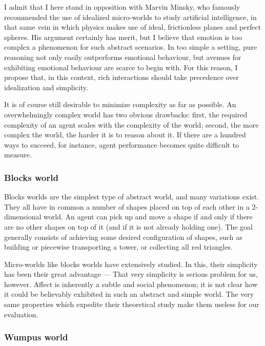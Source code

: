 \documentclass[]{scrartcl}
\theoremstyle{break}
\begin{document}
I admit that I here stand in opposition with Marvin Minsky, who famously recommended the use of idealized micro-worlds to study artificial intelligence, in that same vein in which physics makes use of ideal, frictionless planes and perfect spheres. His argument certainly has merit, but I believe that emotion is too complex a phenomenon for such abstract scenarios. In too simple a setting, pure reasoning not only easily outperforms emotional behaviour, but avenues for exhibiting emotional behaviour are scarce to begin with. For this reason, I propose that, in this context, rich interactions should take precedence over idealization and simplicity.

It is of course still desirable to minimize complexity as far as possible. An overwhelmingly complex world has two obvious drawbacks: first, the required complexity of an agent scales with the complexity of the world; second, the more complex the world, the harder it is to reason about it. If there are a hundred ways to succeed, for instance, agent performance becomes quite difficult to measure.

\subsubsection{Blocks world}

Blocks worlds are the simplest type of abstract world, and many variations exist. They all have in common a number of shapes placed on top of each other in a 2-dimensional world. An agent can pick up and move a shape if and only if there are no other shapes on top of it (and if it is not already holding one). The goal generally consists of achieving some desired configuration of shapes, such as building or piecewise transporting a tower, or collecting all red triangles. 

Micro-worlds like blocks worlds have extensively studied. In this, their simplicity has been their great advantage --- That very simplicity is serious problem for us, however. Affect is inherently a subtle and social phenomenon; it is not clear how it could be believably exhibited in such an abstract and simple world. The very same properties which expedite their theoretical study make them useless for our evaluation.


\subsubsection{Wumpus world}
\end{document}
